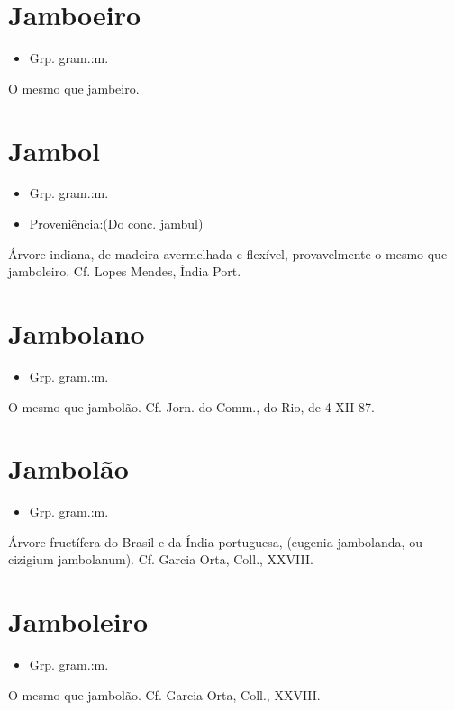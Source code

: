 \documentclass{article}
\begin{document}
\section{Jamboeiro}
\begin{itemize}
\item {Grp. gram.:m.}
\end{itemize}
O mesmo que \textunderscore jambeiro\textunderscore .
\section{Jambol}
\begin{itemize}
\item {Grp. gram.:m.}
\end{itemize}
\begin{itemize}
\item {Proveniência:(Do conc. \textunderscore jambul\textunderscore )}
\end{itemize}
Árvore indiana, de madeira avermelhada e flexível, provavelmente o mesmo que \textunderscore jamboleiro\textunderscore . Cf. Lopes Mendes, \textunderscore Índia Port.\textunderscore 
\section{Jambolano}
\begin{itemize}
\item {Grp. gram.:m.}
\end{itemize}
O mesmo que \textunderscore jambolão\textunderscore . Cf. \textunderscore Jorn. do Comm.\textunderscore , do Rio, de 4-XII-87.
\section{Jambolão}
\begin{itemize}
\item {Grp. gram.:m.}
\end{itemize}
Árvore fructífera do Brasil e da Índia portuguesa, (\textunderscore eugenia jambolanda\textunderscore , ou \textunderscore cizigium jambolanum\textunderscore ). Cf. Garcia Orta, \textunderscore Coll.\textunderscore , XXVIII.
\section{Jamboleiro}
\begin{itemize}
\item {Grp. gram.:m.}
\end{itemize}
O mesmo que \textunderscore jambolão\textunderscore . Cf. Garcia Orta, \textunderscore Coll.\textunderscore , XXVIII.
\end{document}
